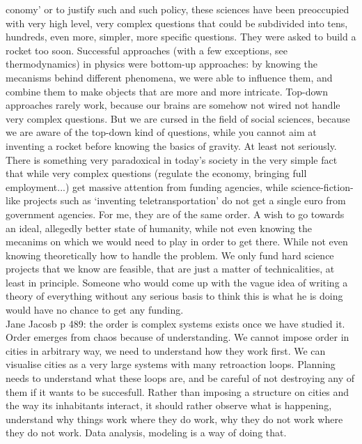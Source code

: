 conomy' or to justify such and such policy, these sciences have been preoccupied
with very high level, very complex questions that could be subdivided into tens,
hundreds, even more, simpler, more specific questions. They were asked to build
a rocket too soon. Successful approaches (with a few exceptions, see
thermodynamics) in physics were bottom-up approaches: by knowing the mecanisms
behind different phenomena, we were able to influence them, and combine them to
make objects that are more and more intricate. Top-down approaches rarely work,
because our brains are somehow not wired not handle very complex questions. But
we are cursed in the field of social sciences, because we are aware of the
top-down kind of questions, while you cannot aim at inventing a rocket before
knowing the basics of gravity. At least not seriously. There is something very
paradoxical in today's society in the very simple fact that while very complex
questions (regulate the economy, bringing full employment...) get massive
attention from funding agencies, while science-fiction-like projects such as
`inventing teletransportation' do not get a single euro from government
agencies. For me, they are of the same order. A wish to go towards an ideal,
allegedly better state of humanity, while not even knowing the mecanims on which
we would need to play in order to get there. While not even knowing
theoretically how to handle the problem. We only fund hard science projects that
we know are feasible, that are just a matter of technicalities, at least in
principle. Someone who would come up with the vague idea of writing a theory of
everything without any serious basis to think this is what he is doing would
have no chance to get any funding.\\

Jane Jacosb p 489: the order is complex systems exists once we have studied it.
Order emerges from chaos because of understanding. We cannot impose order in
cities in arbitrary way, we need to understand how they work first. We can
visualise cities as a very large systems with many retroaction loops. Planning
needs to understand what these loops are, and be careful of not destroying any
of them if it wants to be succesfull. Rather than imposing a structure on cities
and the way its inhabitants interact, it should rather observe what is
happening, understand why things work where they do work, why they do not work
where they do not work. Data analysis, modeling is a way of doing that.

